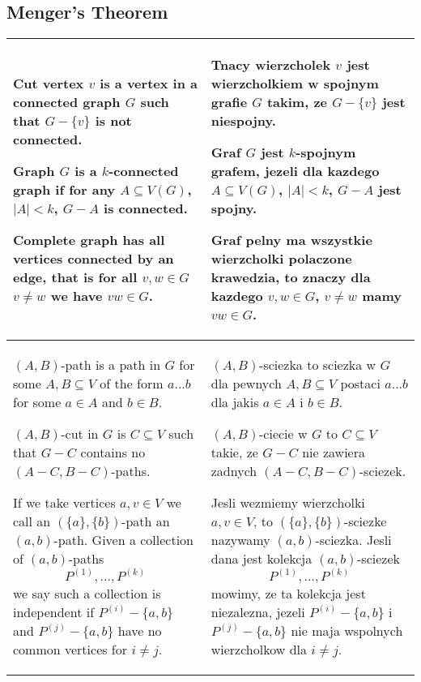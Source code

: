 \subsection{Menger's Theorem}

\begin{tabularx}{\textwidth}{ X!{\color{git90gray}\vrule} X}

    {\color{acc}Cut vertex} $v$ is a vertex in a connected graph $G$ such that $G-\{v\}$ is not connected.
    \smallskip

    Graph $G$ is a {\color{def}$k$-connected graph} if for any $A\subseteq V(G)$, $|A|<k$, $G-A$ is connected.
    \medskip

    {\color{def}Complete graph} has all vertices connected by an edge, that is for all $v,w\in G$ $v\neq w$ we have $vw\in G$.

    &

    {\color{acc}Tnacy wierzcholek} $v$ jest wierzcholkiem w spojnym grafie $G$ takim, ze $G-\{v\}$ jest niespojny.
    \smallskip

    Graf $G$ jest {\color{def}$k$-spojnym grafem}, jezeli dla kazdego $A\subseteq V(G)$, $|A|<k$, $G-A$ jest spojny.
    \medskip

    {\color{def}Graf pelny} ma wszystkie wierzcholki polaczone krawedzia, to znaczy dla kazdego $v,w\in G$, $v\neq w$ mamy $vw\in G$. 
    \\

    \hline

    {\color{def}$(A,B)$-path} is a path in $G$ for some $A,B\subseteq V$ of the form $a...b$ for some $a\in A$ and $b\in B$.

    {\color{def}$(A,B)$-cut} in $G$ is $C\subseteq V$ such that $G-C$ contains no $(A-C,B-C)$-paths.
    \smallskip

    If we take vertices $a,v\in V$ we call an $(\{a\},\{b\})$-path an $(a,b)$-path. Given a collection of $(a,b)$-paths
    $$P^{(1)},...,P^{(k)}$$
    we say such a collection is {\color{def}independent} if $P^{(i)}-\{a,b\}$ and $P^{(j)}-\{a,b\}$ have no common vertices for $i\neq j$.

    &

    {\color{def}$(A,B)$-sciezka} to sciezka w $G$ dla pewnych $A,B\subseteq V$ postaci $a...b$ dla jakis $a\in A$ i $b\in B$.

    {\color{def}$(A,B)$-ciecie} w $G$ to $C\subseteq V$ takie, ze $G-C$ nie zawiera zadnych $(A-C, B-C)$-sciezek.
    \smallskip

    Jesli wezmiemy wierzcholki $a,v\in V$, to $(\{a\},\{b\})$-sciezke nazywamy $(a,b)$-sciezka. Jesli dana jest kolekcja $(a,b)$-sciezek
    $$P^{(1)},...,P^{(k)}$$
    mowimy, ze ta kolekcja jest {\color{def}niezalezna}, jezeli $P^{(i)}-\{a,b\}$ i $P^{(j)}-\{a,b\}$ nie maja wspolnych wierzcholkow dla $i\neq j$.

\end{tabularx}

